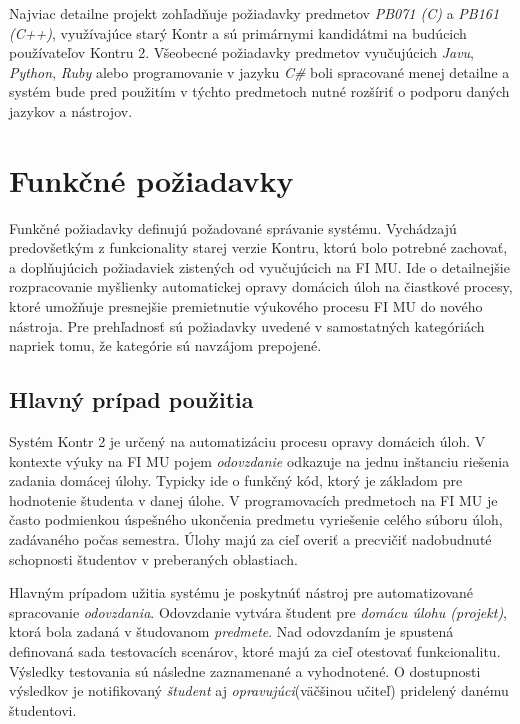 \documentclass[
  digital, %
  twoside, %
  table,   %
  lof,     %
  lot,     %
]{fithesis3}
\begin{document}
Najviac detailne projekt zohľadňuje požiadavky predmetov \emph{PB071 (C)} a \emph{PB161 (C++)}, využívajúce starý Kontr a sú primárnymi kandidátmi na budúcich používateľov Kontru 2. Všeobecné požiadavky predmetov vyučujúcich \emph{Javu}, \emph{Python}, \emph{Ruby} alebo programovanie v jazyku \emph{C\#} boli spracované menej detailne a systém bude pred použitím v týchto predmetoch nutné rozšíriť o podporu daných jazykov a nástrojov. 

\section{Funkčné požiadavky}

Funkčné požiadavky definujú požadované správanie systému. Vychádzajú predovšetkým z funkcionality starej verzie Kontru, ktorú bolo potrebné zachovať, a doplňujúcich požiadaviek zistených od vyučujúcich na FI MU. Ide o detailnejšie rozpracovanie myšlienky automatickej opravy domácich úloh na čiastkové procesy, ktoré umožňuje presnejšie premietnutie výukového procesu FI MU do nového nástroja. Pre prehľadnosť sú požiadavky uvedené v samostatných kategóriách napriek tomu, že kategórie sú navzájom prepojené.

\subsection{Hlavný prípad použitia}

Systém Kontr 2 je určený na automatizáciu procesu opravy domácich úloh. V kontexte výuky na FI MU pojem \textit{odovzdanie} odkazuje na jednu inštanciu riešenia zadania domácej úlohy. Typicky ide o funkčný kód, ktorý je základom pre hodnotenie študenta v danej úlohe. V programovacích predmetoch na FI MU je často podmienkou úspešného ukončenia predmetu vyriešenie celého súboru úloh, zadávaného počas semestra. Úlohy majú za cieľ overiť a precvičiť nadobudnuté schopnosti študentov v preberaných oblastiach. 

Hlavným prípadom užitia systému je poskytnúť nástroj pre automatizované spracovanie \emph{odovzdania}. Odovzdanie vytvára študent pre \emph{domácu úlohu (projekt)}, ktorá bola zadaná v študovanom \emph{predmete}. Nad odovzdaním je spustená definovaná sada testovacích scenárov, ktoré majú za cieľ otestovať funkcionalitu. Výsledky testovania sú následne zaznamenané a vyhodnotené. O dostupnosti výsledkov je notifikovaný \emph{študent} aj \emph{opravujúci}(väčšinou učiteľ) pridelený danému študentovi.
\end{document}
